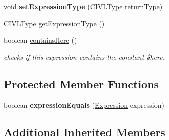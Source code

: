 \begin{DoxyCompactItemize}
\item 
\hypertarget{classedu_1_1udel_1_1cis_1_1vsl_1_1civl_1_1model_1_1common_1_1expression_1_1CommonSystemFunctionCallExpression_ab2fd82e23a9acff001a3cf4396731869}{}void {\bfseries set\+Expression\+Type} (\hyperlink{interfaceedu_1_1udel_1_1cis_1_1vsl_1_1civl_1_1model_1_1IF_1_1type_1_1CIVLType}{C\+I\+V\+L\+Type} return\+Type)\label{classedu_1_1udel_1_1cis_1_1vsl_1_1civl_1_1model_1_1common_1_1expression_1_1CommonSystemFunctionCallExpression_ab2fd82e23a9acff001a3cf4396731869}

\item 
\hyperlink{interfaceedu_1_1udel_1_1cis_1_1vsl_1_1civl_1_1model_1_1IF_1_1type_1_1CIVLType}{C\+I\+V\+L\+Type} \hyperlink{classedu_1_1udel_1_1cis_1_1vsl_1_1civl_1_1model_1_1common_1_1expression_1_1CommonSystemFunctionCallExpression_a1618e466f0aaa0960620c099ee3ecfbf}{get\+Expression\+Type} ()
\item 
boolean \hyperlink{classedu_1_1udel_1_1cis_1_1vsl_1_1civl_1_1model_1_1common_1_1expression_1_1CommonSystemFunctionCallExpression_a788f3869c1fb0fd42a414d40f8d895ea}{contains\+Here} ()
\begin{DoxyCompactList}\small\item\em checks if this expression contains the constant \$here. \end{DoxyCompactList}\end{DoxyCompactItemize}
\subsection*{Protected Member Functions}
\begin{DoxyCompactItemize}
\item 
\hypertarget{classedu_1_1udel_1_1cis_1_1vsl_1_1civl_1_1model_1_1common_1_1expression_1_1CommonSystemFunctionCallExpression_a4f6843ef19b56d1408ee04bacd6432e6}{}boolean {\bfseries expression\+Equals} (\hyperlink{interfaceedu_1_1udel_1_1cis_1_1vsl_1_1civl_1_1model_1_1IF_1_1expression_1_1Expression}{Expression} expression)\label{classedu_1_1udel_1_1cis_1_1vsl_1_1civl_1_1model_1_1common_1_1expression_1_1CommonSystemFunctionCallExpression_a4f6843ef19b56d1408ee04bacd6432e6}

\end{DoxyCompactItemize}
\subsection*{Additional Inherited Members}


